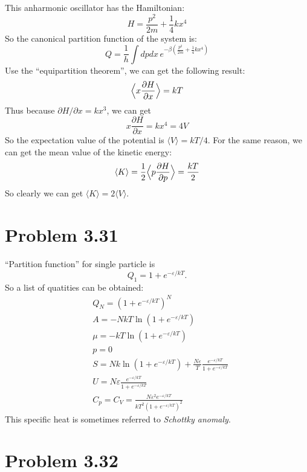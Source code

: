 \documentclass{article}
\begin{document}
This anharmonic oscillator has the Hamiltonian:
$$
H = \frac{p^2}{2m} + \frac{1}{4}kx^4
$$
So the canonical partition function of the system is:
\begin{equation}
Q = \frac{1}{h}\int dpdx\,e^{-\beta\left(\frac{p^2}{2m} + \frac{1}{4}kx^4\right) }
\end{equation}
Use the ``equipartition theorem'', we can get the following result:
\begin{equation}
\Big{\langle} x \frac{\partial H}{\partial x}\Big{\rangle} =kT
\end{equation}
Thus because $\partial H/\partial x = kx^3$, we can get
$$
x\frac{\partial H}{\partial x} = kx^4 = 4V
$$
So the expectation value of the potential is $\langle V\rangle = kT/4$. For the same reason, we can get the mean value of the kinetic energy:
\begin{equation}
\langle K\rangle = \frac{1}{2}\Big{\langle} p\frac{\partial H}{\partial p}\Big{\rangle} = \frac{kT}{2}
\end{equation}
So clearly we can get $\langle K\rangle = 2\langle V\rangle$.

\section*{Problem 3.31}
``Partition function'' for single particle is
\begin{equation}
Q_{1} = 1 + e^{-\varepsilon/kT}.
\end{equation}
So a list of quatities can be obtained:
\begin{align}
&Q_{N} = (1 + e^{-\varepsilon/kT})^{N} \\
&A = - NkT \ln (1 + e^{-\varepsilon/kT}) \\
&\mu = - kT \ln (1 + e^{-\varepsilon/kT}) \\
&p=0 \\
&S = Nk \ln (1 + e^{-\varepsilon/kT}) + \frac{N \varepsilon}{T} \frac{e^{-\varepsilon/kT}}{1+e^{-\varepsilon/kT}} \\
&U =  N \varepsilon \frac{e^{-\varepsilon/kT}}{1+e^{-\varepsilon/kT}} \\
&C_{p} = C_{V} =  \frac{N \varepsilon^{2} e^{-\varepsilon/kT}}{kT^{2} (1+e^{-\varepsilon/kT})^{2}}
\end{align}
This specific heat is sometimes referred to \emph{Schottky anomaly}. 

\section*{Problem 3.32}
\end{document}
